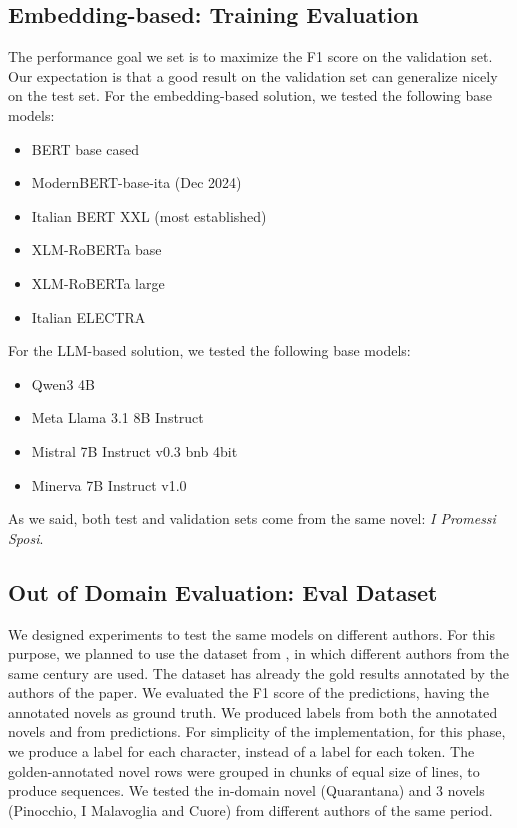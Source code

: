 \documentclass[11pt]{article}
\begin{document}
\subsection{Embedding-based: Training Evaluation}
The performance goal we set is to maximize the F1 score on the validation set. Our expectation is that a good result on the validation set can generalize nicely on the test set. \newline For the embedding-based solution, we tested the following base models:
 \begin{itemize}
 	\item BERT base cased
	\item ModernBERT-base-ita (Dec 2024)
	\item Italian BERT XXL (most established)
	\item XLM-RoBERTa base
	\item XLM-RoBERTa large
	\item Italian ELECTRA
\end{itemize}
For the LLM-based solution, we tested the following base models:
 \begin{itemize}
 	\item Qwen3 4B
	\item Meta Llama 3.1 8B Instruct
	\item Mistral 7B Instruct v0.3 bnb 4bit
	\item Minerva 7B Instruct v1.0
\end{itemize}
As we said, both test and validation sets come from the same novel: \emph{I Promessi Sposi}. 

\subsection{Out of Domain Evaluation: Eval Dataset}
We designed experiments to test the same models on different authors.
For this purpose, we planned to use the dataset from \cite{redaelli-sprugnoli-2024-sentence}, in which different authors from the same century are used. \newline The dataset has already the gold results annotated by the authors of the paper. \newline We evaluated the F1 score of the predictions, having the annotated
novels as ground truth. \newline We produced labels from both the annotated novels and from predictions. For simplicity of the implementation, for this phase, we produce a label for each character, instead of a label for each token. \newline The golden-annotated novel rows were grouped in chunks of equal size of lines, to produce sequences. \newline We tested the in-domain novel (Quarantana) and 3 novels (Pinocchio, I Malavoglia and Cuore) from different authors of the same period.
\end{document}
